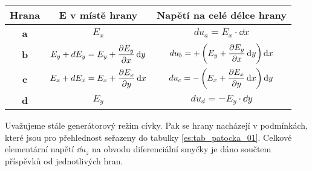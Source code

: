        \begin{table*}[ht!]
          \centering
          \begin{tabular}{|c|c|c|}
            \rowcolor[HTML]{FFFFC7}
            \hline Hrana      & E v místě hrany 
                              & Napětí na celé délce hrany                                     \\ 
            \hline \textbf{a} & \(E_x\)
                              & \(du_a=E_x\cdot \dd{x}\)                                       \\ 
            \hline \textbf{b} & \(E_y+dE_y = E_y + \dfrac{\partial E_y}{\partial x}\mathop{}\!\mathrm{d}y\) 
                              & \(du_b= +\left(E_y + \dfrac{\partial E_y}{\partial x}\mathop{}\!\mathrm{d}y\right)\mathop{}\!\mathrm{d}x\)        \\ 
            \hline \textbf{c} & \(E_x+dE_x = E_x + \dfrac{\partial E_x}{\partial y}\mathop{}\!\mathrm{d}x\)
                              & \(du_c= -\left(E_x + \dfrac{\partial E_x}{\partial y}\mathop{}\!\mathrm{d}x\right)\mathop{}\!\mathrm{d}y\)        \\ 
            \hline \textbf{d} & \(E_y\)                              
                              & \(du_d= - E_y\cdot \dd{y}\)                                    \\ 
            \hline 
          \end{tabular} 
          \caption{Podmínky, ve kterých se nacházejí hrany \(a, b, c, d\) diferenciální plochy 
                   \(dS_z\). Znaménko je vztaženo vůči zvolenému směru oběhu.}
          \label{es:tab_patocka_01}
        \end{table*}
        
        Uvažujeme stále generátorový režim cívky. Pak se hrany nacházejí v podmínkách, které jsou 
        pro přehlednost seřazeny do tabulky \ref{es:tab_patocka_01}. Celkové elementární napětí 
        \(\dd{u_z}\) na obvodu diferenciální smyčky je dáno součtem příspěvků od jednotlivých hran.
        
